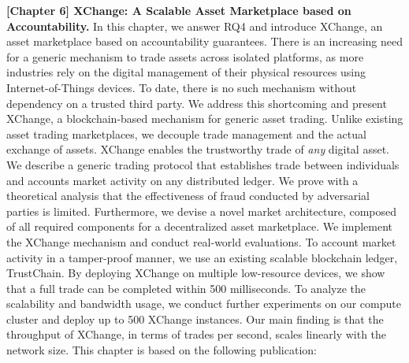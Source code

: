 \textbf{[Chapter 6] XChange: A Scalable Asset Marketplace based on Accountability.}
In this chapter, we answer RQ4 and introduce XChange, an asset marketplace based on accountability guarantees.
There is an increasing need for a generic mechanism to trade assets across isolated platforms, as more industries rely on the digital management of their physical resources using Internet-of-Things devices.
To date, there is no such mechanism without dependency on a trusted third party.
We address this shortcoming and present XChange, a blockchain-based mechanism for generic asset trading.
Unlike existing asset trading marketplaces, we decouple trade management and the actual exchange of assets.
XChange enables the trustworthy trade of \emph{any} digital asset.
We describe a generic trading protocol that establishes trade between individuals and accounts market activity on any distributed ledger.
We prove with a theoretical analysis that the effectiveness of fraud conducted by adversarial parties is limited.
Furthermore, we devise a novel market architecture, composed of all required components for a decentralized asset marketplace.
We implement the XChange mechanism and conduct real-world evaluations.
To account market activity in a tamper-proof manner, we use an existing scalable blockchain ledger, TrustChain.
By deploying XChange on multiple low-resource devices, we show that a full trade can be completed within 500 milliseconds.
To analyze the scalability and bandwidth usage, we conduct further experiments on our compute cluster and deploy up to 500 XChange instances.
Our main finding is that the throughput of XChange, in terms of trades per second, scales linearly with the network size.
This chapter is based on the following publication:

\\

